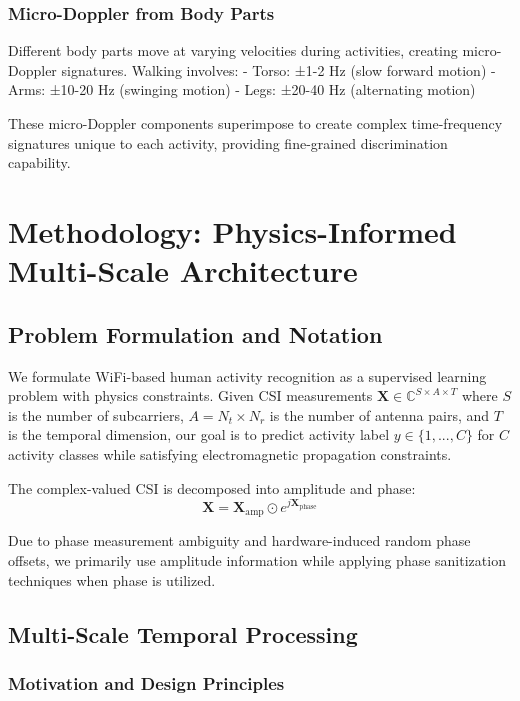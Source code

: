 \documentclass[10pt,journal,compsoc]{IEEEtran}
\begin{document}
\subsubsection{Micro-Doppler from Body Parts}

Different body parts move at varying velocities during activities, creating micro-Doppler signatures. Walking involves:
- Torso: ±1-2 Hz (slow forward motion)
- Arms: ±10-20 Hz (swinging motion)
- Legs: ±20-40 Hz (alternating motion)

These micro-Doppler components superimpose to create complex time-frequency signatures unique to each activity, providing fine-grained discrimination capability.

\section{Methodology: Physics-Informed Multi-Scale Architecture}
\label{sec:methodology}

\subsection{Problem Formulation and Notation}

We formulate WiFi-based human activity recognition as a supervised learning problem with physics constraints. Given CSI measurements $\mathbf{X} \in \mathbb{C}^{S \times A \times T}$ where $S$ is the number of subcarriers, $A = N_t \times N_r$ is the number of antenna pairs, and $T$ is the temporal dimension, our goal is to predict activity label $y \in \{1, ..., C\}$ for $C$ activity classes while satisfying electromagnetic propagation constraints.

The complex-valued CSI is decomposed into amplitude and phase:
\begin{equation}
\mathbf{X} = \mathbf{X}_{\text{amp}} \odot e^{j\mathbf{X}_{\text{phase}}}
\end{equation}

Due to phase measurement ambiguity and hardware-induced random phase offsets, we primarily use amplitude information while applying phase sanitization techniques when phase is utilized.

\subsection{Multi-Scale Temporal Processing}

\subsubsection{Motivation and Design Principles}
\end{document}
